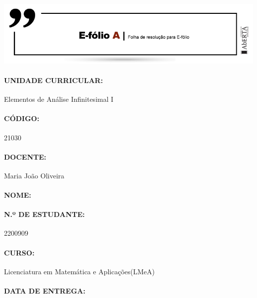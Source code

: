 \includegraphics[width=\textwidth]{./images/e-folio-a.jpg}

\paragraph{\textbf{UNIDADE CURRICULAR:}} Elementos de Análise Infinitesimal I

\paragraph{\textbf{CÓDIGO:}} 21030

\paragraph{\textbf{DOCENTE:}} Maria João Oliveira

\paragraph{\textbf{NOME:}} \theauthor

\paragraph{\textbf{N.º DE ESTUDANTE:}} 2200909

\paragraph{\textbf{CURSO:}} Licenciatura em Matemática e Aplicações(LMeA)

\paragraph{\textbf{DATA DE ENTREGA:}} \thedate
